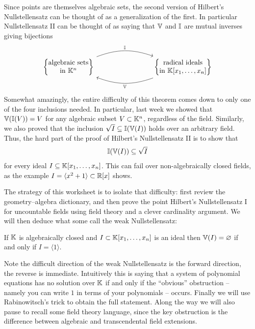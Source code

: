 \documentclass[12pt,reqno]{amsart}
\begin{document}
Since points are themselves algebraic sets, the second version of Hilbert's Nullstellensatz can be thought of as a generalization of the first. In particular Nullstellensatz II can be thought of as saying that $\mathbb{V}$ and $\mathbb{I}$ are mutual inverses giving bijections
\[
\begin{tikzcd}[row sep = .5 em, column sep = 8em]
\left\{ \begin{matrix} 
\text{algebraic sets} \\
\text{in $\KK^n$}
\end{matrix} \right\} \arrow[r, bend left=20, "\II"] & \arrow[l,bend left=20,"\VV"]
\left\{ \begin{matrix} 
\text{radical ideals} \\
\text{in $\KK[x_1,\ldots,x_n]$}
\end{matrix} \right\} 
\end{tikzcd}
\]
Somewhat amazingly, the entire difficulty of this theorem comes down to only one of the four inclusions needed. In particular, last week we showed that $\mathbb{V}(\mathbb{I}(V))=V$ for any algebraic subset $V\subset \mathbb{K}^n$, regardless of the field. Similarly, we also proved that the inclusion $\sqrt{I}\subseteq \mathbb{I}(\mathbb{V}(I))$ holds over an arbitrary field. Thus, the hard part of the proof of Hilbert's Nullstellensatz II is to show that
\[
\mathbb{I}(\mathbb{V}(I))\subseteq \sqrt{I}
\]
for every ideal $I\subseteq \mathbb{K}[x_1,\ldots,x_n]$. This can fail over non-algebraically closed fields, as the example $I=\langle x^2+1\rangle \subset \mathbb{R}[x]$ shows.

The strategy of this worksheet is to isolate that difficulty: first review the geometry--algebra dictionary, and then prove the point Hilbert's Nullstellensatz I for uncountable fields using field theory and a clever cardinality argument. We will then deduce what some call the weak Nullstellensatz:

 \begin{theorem} If $\mathbb{K}$ is algebraically closed and $I\subset \mathbb{K}[x_1,\ldots,x_n]$ is an ideal then $\mathbb{V}(I)=\varnothing$ if and only if $I = \langle 1 \rangle$.
\end{theorem}

Note the difficult direction of the weak Nullstellensatz is the forward direction, the reverse is immediate. Intuitively this is saying that a system of polynomial equations has no solution over $\mathbb{K}$ if and only if the ``obvious'' obstruction -- namely you can write $1$ in terms of your polynomials -- occurs.  Finally we will  use Rabinowitsch's trick to obtain the full statement. Along the way we will also pause to recall some field theory language, since the key obstruction is the difference between algebraic and transcendental field extensions.
\end{document}
